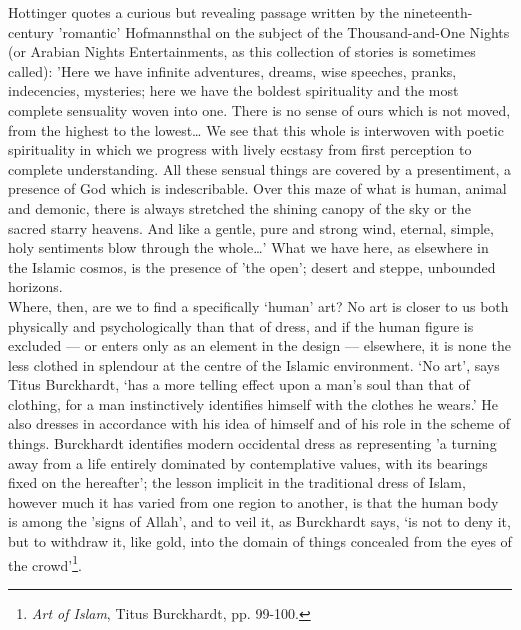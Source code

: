 \documentclass[10pt, twoside]{book}
\begin{document}
Hottinger quotes a curious but revealing passage written by the nineteenth\hyp{}century 'romantic' 
Hofmannsthal on the subject of the Thousand\hyp{}and\hyp{}One Nights (or Arabian Nights Entertainments, as this 
collection of stories is sometimes called): 'Here we have infinite adventures, dreams, wise speeches, 
pranks, indecencies, mysteries; here we have the boldest spirituality and the most complete 
sensuality woven into one. There is no sense of ours which is not moved, from the highest to the 
lowest\ldots{} We see that this whole is interwoven with poetic spirituality in which we progress with 
lively ecstasy from first perception to complete understanding. All these sensual things are covered 
by a presentiment, a presence of God which is indescribable. Over this maze of what is human, animal 
and demonic, there is always stretched the shining canopy of the sky or the sacred starry heavens. 
And like a gentle, pure and strong wind, eternal, simple, holy sentiments blow through the whole\ldots{}' 
What we have here, as elsewhere in the Islamic cosmos, is the presence of 'the open'; desert and 
steppe, unbounded horizons. \\

Where, then, are we to find a specifically `human' art? No art is closer to us both physically and 
psychologically than that of dress, and if the human figure is excluded --- or enters only as an 
element in the design --- elsewhere, it is none the less clothed in splendour at the centre of the 
Islamic environment. `No art', says Titus Burckhardt, `has a more telling effect upon a man's soul 
than that of clothing, for a man instinctively identifies himself with the clothes he wears.' He also 
dresses in accordance with his idea of himself and of his role in the scheme of things. Burckhardt 
identifies modern occidental dress as representing 'a turning away from a life entirely dominated by 
contemplative values, with its bearings fixed on the hereafter'; the lesson implicit in the 
traditional dress of Islam, however much it has varied from one region to another, is that the human 
body is among the 'signs of Allah', and to veil it, as Burckhardt says, `is not to deny it, but to 
withdraw it, like gold, into the domain of things concealed from the eyes of the crowd'\footnote{\emph{Art of Islam}, Titus Burckhardt, pp. 99-100.}. \\
\end{document}
